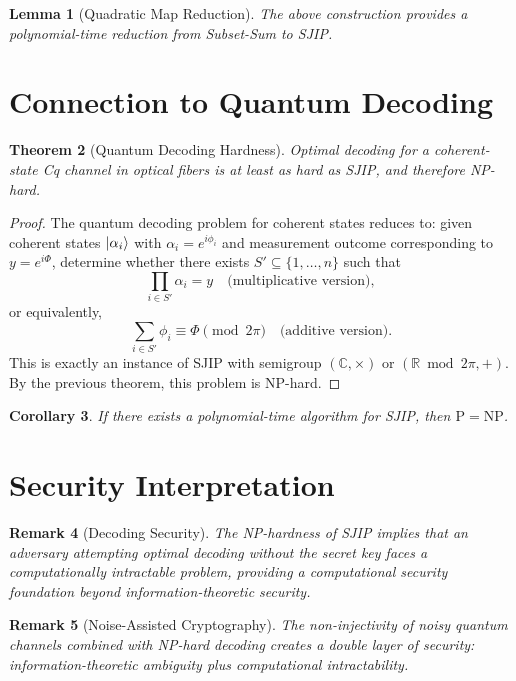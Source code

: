 \documentclass[12pt]{article}
\newtheorem{theorem}{Theorem}[section]
\newtheorem{lemma}[theorem]{Lemma}
\newtheorem{remark}[theorem]{Remark}
\newtheorem{corollary}[theorem]{Corollary}
\begin{document}
\begin{lemma}[Quadratic Map Reduction]
    The above construction provides a polynomial-time reduction from Subset-Sum to SJIP.
\end{lemma}

\section{Connection to Quantum Decoding}
\begin{theorem}[Quantum Decoding Hardness]
    Optimal decoding for a coherent-state Cq channel in optical fibers is at least as hard as SJIP, and therefore NP-hard.
\end{theorem}
\begin{proof}
    The quantum decoding problem for coherent states reduces to: given coherent states $\ket{\alpha_i}$ with $\alpha_i = e^{i\phi_i}$ and measurement outcome corresponding to $y = e^{i\Phi}$, determine whether there exists $S' \subseteq \{1,\dots,n\}$ such that
    \begin{equation}
        \prod_{i \in S'} \alpha_i = y \quad \text{(multiplicative version)},
    \end{equation}
    or equivalently,
    \begin{equation}
        \sum_{i \in S'} \phi_i \equiv \Phi \pmod{2\pi} \quad \text{(additive version)}.
    \end{equation}
    This is exactly an instance of SJIP with semigroup $(\mathbb{C}, \times)$ or $(\mathbb{R} \bmod 2\pi, +)$. By the previous theorem, this problem is NP-hard.
\end{proof}

\begin{corollary}
    If there exists a polynomial-time algorithm for SJIP, then $\mathrm{P} = \mathrm{NP}$.
\end{corollary}

\section{Security Interpretation}
\begin{remark}[Decoding Security]
    The NP-hardness of SJIP implies that an adversary attempting optimal decoding without the secret key faces a computationally intractable problem, providing a computational security foundation beyond information-theoretic security.
\end{remark}

\begin{remark}[Noise-Assisted Cryptography]
    The non-injectivity of noisy quantum channels combined with NP-hard decoding creates a double layer of security: information-theoretic ambiguity plus computational intractability.
\end{remark}
\end{document}
